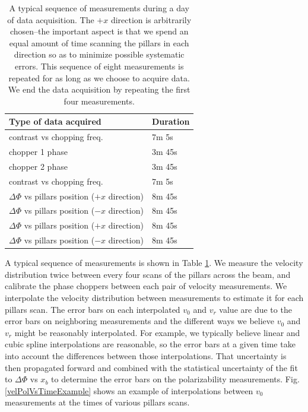 \documentclass[twocolumn,prl,showpacs,superscriptaddress]{revtex4-1}   %
\newcommand{\figref}[1]{Fig. \ref{#1}}
\begin{document}
\begin{figure}
\end{figure}

\begingroup
\begin{table}
\caption{\label{schedule}A typical sequence of measurements during a day of data acquisition. The $+x$ direction is arbitrarily chosen--the important aspect is that we spend an equal amount of time scanning the pillars in each direction so as to minimize possible systematic errors. This sequence of eight measurements is repeated for as long as we choose to acquire data. We end the data acquisition by repeating the first four measurements.}
\begin{center}
\begin{tabular}{l l}
\hline
\hline
Type of data acquired & Duration \\
\hline
contrast vs chopping freq. & 7m 5s \\
chopper 1 phase & 3m 45s \\
chopper 2 phase & 3m 45s\\
contrast vs chopping freq. & 7m 5s \\
$\Delta\Phi$ vs pillars position ($+x$ direction) & 8m 45s \\
$\Delta\Phi$ vs pillars position ($-x$ direction) & 8m 45s \\
$\Delta\Phi$ vs pillars position ($+x$ direction) & 8m 45s \\
$\Delta\Phi$ vs pillars position ($-x$ direction) & 8m 45s \\
\hline
\hline
\end{tabular}
\end{center}
\end{table}
\endgroup

A typical sequence of measurements is shown in Table \ref{schedule}.
We measure the velocity distribution twice between every four scans of the pillars across the beam, and calibrate the phase choppers between each pair of velocity measurements.
We interpolate the velocity distribution between measurements to estimate it for each pillars scan. The error bars on each interpolated $v_0$ and $v_r$ value are due to the error bars on neighboring measurements and the different ways we believe $v_0$ and $v_r$ might be reasonably interpolated. For example, we typically believe linear and cubic spline interpolations are reasonable, so the error bars at a given time take into account the differences between those interpolations. That uncertainty is then propagated forward and combined with the statistical uncertainty of the fit to $\Delta\Phi$ vs $x_b$ to determine the error bars on the polarizability measurements. \figref{velPolVsTimeExample} shows an example of interpolations between $v_0$ measurements at the times of various pillars scans.
\end{document}
